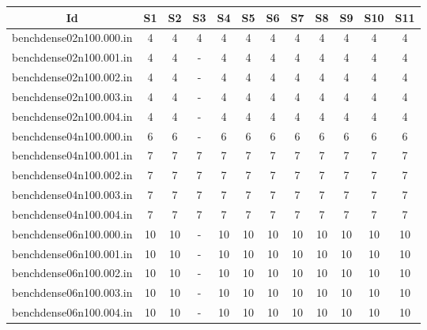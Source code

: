 \documentclass[landscape, 12pt]{report}
\begin{document}
\begin{tabular}{|c|c|c|c|c|c|c|c|c|c|c|c|}
\hline
\multicolumn{1}{|c|}{Id} & \multicolumn{1}{|c|}{S1} & \multicolumn{1}{|c|}{S2} & \multicolumn{1}{|c|}{S3} & \multicolumn{1}{|c|}{S4} & \multicolumn{1}{|c|}{S5} & \multicolumn{1}{|c|}{S6} & \multicolumn{1}{|c|}{S7} & \multicolumn{1}{|c|}{S8} & \multicolumn{1}{|c|}{S9} & \multicolumn{1}{|c|}{S10} & \multicolumn{1}{|c|}{S11}
\\
\hline
benchdense02n100.000.in &    4 &    4 &    4 &    4 &    4 &    4 &    4 &    4 &    4 &    4 &    4
\\
benchdense02n100.001.in &    4 &    4 &    - &    4 &    4 &    4 &    4 &    4 &    4 &    4 &    4
\\
benchdense02n100.002.in &    4 &    4 &    - &    4 &    4 &    4 &    4 &    4 &    4 &    4 &    4
\\
benchdense02n100.003.in &    4 &    4 &    - &    4 &    4 &    4 &    4 &    4 &    4 &    4 &    4
\\
benchdense02n100.004.in &    4 &    4 &    - &    4 &    4 &    4 &    4 &    4 &    4 &    4 &    4
\\
benchdense04n100.000.in &    6 &    6 &    - &    6 &    6 &    6 &    6 &    6 &    6 &    6 &    6
\\
benchdense04n100.001.in &    7 &    7 &    7 &    7 &    7 &    7 &    7 &    7 &    7 &    7 &    7
\\
benchdense04n100.002.in &    7 &    7 &    7 &    7 &    7 &    7 &    7 &    7 &    7 &    7 &    7
\\
benchdense04n100.003.in &    7 &    7 &    7 &    7 &    7 &    7 &    7 &    7 &    7 &    7 &    7
\\
benchdense04n100.004.in &    7 &    7 &    7 &    7 &    7 &    7 &    7 &    7 &    7 &    7 &    7
\\
benchdense06n100.000.in &   10 &   10 &    - &   10 &   10 &   10 &   10 &   10 &   10 &   10 &   10
\\
benchdense06n100.001.in &   10 &   10 &    - &   10 &   10 &   10 &   10 &   10 &   10 &   10 &   10
\\
benchdense06n100.002.in &   10 &   10 &    - &   10 &   10 &   10 &   10 &   10 &   10 &   10 &   10
\\
benchdense06n100.003.in &   10 &   10 &    - &   10 &   10 &   10 &   10 &   10 &   10 &   10 &   10
\\
benchdense06n100.004.in &   10 &   10 &    - &   10 &   10 &   10 &   10 &   10 &   10 &   10 &   10
\\

\end{tabular}
\end{document}
